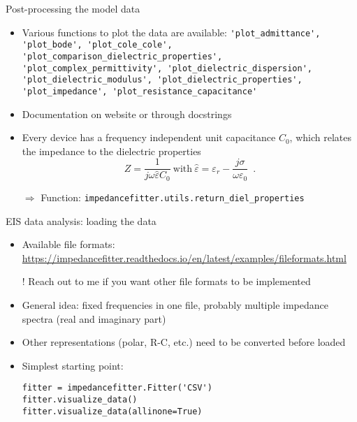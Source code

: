 \documentclass[11pt]{beamer}
\begin{document}
\begin{frame}{Post-processing the model data}

\begin{itemize}
\item Various functions to plot the data are available: \lstinline{'plot_admittance', 'plot_bode', 'plot_cole_cole', 'plot_comparison_dielectric_properties', 'plot_complex_permittivity', 'plot_dielectric_dispersion', 'plot_dielectric_modulus', 'plot_dielectric_properties', 'plot_impedance', 'plot_resistance_capacitance'}
\item[$\Rightarrow$] Documentation on website or through docstrings
\item Every device has a frequency independent unit capacitance $C_0$, which relates the impedance to the dielectric properties
\begin{equation}
Z = \frac{1}{j \omega \hat{\varepsilon} C_0}~\mathrm{with}~ \hat{\varepsilon} = \varepsilon_r - \frac{j \sigma}{\omega \varepsilon_0} \enspace .
\end{equation}
\item[$\Rightarrow$] Function: \lstinline{impedancefitter.utils.return_diel_properties}
\end{itemize}
\end{frame}

\begin{frame}[fragile]{EIS data analysis: loading the data}
\begin{itemize}
\item Available file formats: \url{https://impedancefitter.readthedocs.io/en/latest/examples/fileformats.html}
\item[!] Reach out to me if you want other file formats to be implemented
\item General idea: fixed frequencies in one file, probably multiple impedance spectra (real and imaginary part)
\item Other representations (polar, R-C, etc.) need to be converted before loaded
\item Simplest starting point:
\begin{lstlisting}
fitter = impedancefitter.Fitter('CSV')
fitter.visualize_data()
fitter.visualize_data(allinone=True)
\end{lstlisting}
\end{itemize}
\end{frame}
\end{document}

